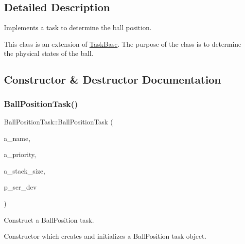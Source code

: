 \subsection{Detailed Description}
Implements a task to determine the ball position. 

This class is an extension of {\ttfamily \mbox{\hyperlink{class_task_base}{Task\+Base}}}. The purpose of the class is to determine the physical states of the ball. 

\subsection{Constructor \& Destructor Documentation}
\mbox{\label{class_ball_position_task_a4c6a431cab2bb0ed34445bfd79ba7dd5}} 
\subsubsection{\texorpdfstring{Ball\+Position\+Task()}{BallPositionTask()}}
{\footnotesize\ttfamily Ball\+Position\+Task\+::\+Ball\+Position\+Task (\begin{DoxyParamCaption}\item[{const char $\ast$}]{a\+\_\+name,  }\item[{unsigned port\+B\+A\+S\+E\+\_\+\+T\+Y\+PE}]{a\+\_\+priority,  }\item[{size\+\_\+t}]{a\+\_\+stack\+\_\+size,  }\item[{\mbox{\hyperlink{classemstream}{emstream}} $\ast$}]{p\+\_\+ser\+\_\+dev }\end{DoxyParamCaption})}



Construct a Ball\+Position task. 

Constructor which creates and initializes a Ball\+Position task object.

